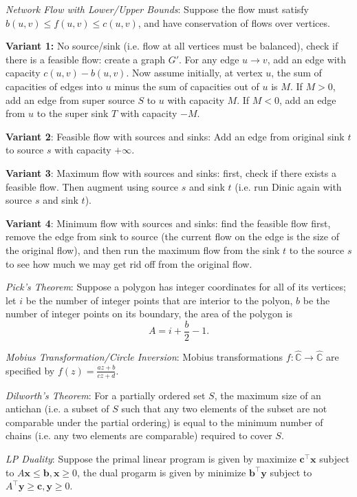 \emph{Network Flow with Lower/Upper Bounds}: Suppose the flow must satisfy $b(u,v) \leq f(u,v) \leq c(u,v)$, and have conservation of flows over vertices.

\textbf{Variant 1:} No source/sink (i.e. flow at all vertices must be balanced), check if there is a feasible flow: create a graph $G'$. For any edge $u \rightarrow v$, add an edge with capacity $c(u,v) - b(u,v)$. Now assume initially, at vertex $u$, the sum of capacities of edges into $u$ minus the sum of capacities out of $u$ is $M$. If $M > 0$, add an edge from super source $S$ to $u$ with capacity $M$. If $M < 0$, add an edge from $u$ to the super sink $T$ with capacity $-M$.

\textbf{Variant 2}: Feasible flow with sources and sinks: Add an edge from original sink $t$ to source $s$ with capacity $+\infty$.

\textbf{Variant 3}: Maximum flow with sources and sinks: first, check if there exists a feasible flow. Then augment using source $s$ and sink $t$ (i.e. run Dinic again with source $s$ and sink $t$).

\textbf{Variant 4}: Minimum flow with sources and sinks: find the feasible flow first, remove the edge from sink to source (the current flow on the edge is the size of the original flow), and then run the maximum flow from the sink $t$ to the source $s$ to see how much we may get rid off from the original flow.

\emph{Pick's Theorem}: Suppose a polygon has integer coordinates for all of its vertices; let $i$ be the number of integer points that are interior to the polyon, $b$ be the number of integer points on its boundary, the area of the polygon is
\begin{equation*}
  A = i + \frac{b}{2}-1.
\end{equation*}

\emph{Mobius Transformation/Circle Inversion}: Mobius transformations $f: \hat{\mathbb{C}} \rightarrow \hat{\mathbb{C}}$ are specified by $f(z) = \frac{az+b}{cz+d}$.

\emph{Dilworth's Theorem}: For a partially ordered set $S$, the maximum size of an antichan (i.e. a subset of $S$ such that any two elements of the subset are not comparable under the partial ordering) is equal to the minimum number of chains (i.e. any two elements are comparable) required to cover $S$.

\emph{LP Duality}: Suppose the primal linear program is given by maximize $\mathbf{c}^\top \mathbf{x}$ subject to $A\mathbf{x} \leq \mathbf{b}, \mathbf{x} \geq 0$, the dual progarm is given by minimize $\mathbf{b}^\top \mathbf{y}$ subject to $A^\top \mathbf{y} \geq \mathbf{c}, \mathbf{y} \geq 0$.

